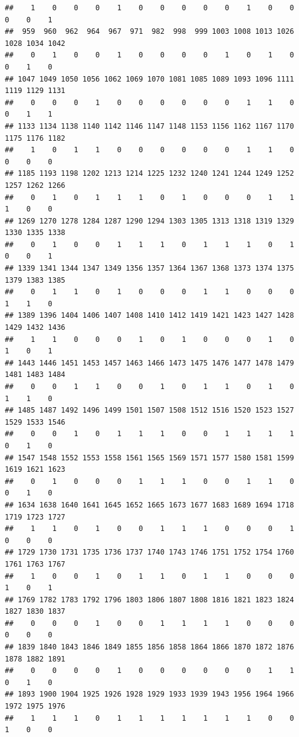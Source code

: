 \documentclass[
]{article}
\begin{document}
\begin{verbatim}
##    1    0    0    0    1    0    0    0    0    0    1    0    0    0    0    1 
##  959  960  962  964  967  971  982  998  999 1003 1008 1013 1026 1028 1034 1042 
##    0    1    0    0    1    0    0    0    0    1    0    1    0    0    1    0 
## 1047 1049 1050 1056 1062 1069 1070 1081 1085 1089 1093 1096 1111 1119 1129 1131 
##    0    0    0    1    0    0    0    0    0    0    1    1    0    0    1    1 
## 1133 1134 1138 1140 1142 1146 1147 1148 1153 1156 1162 1167 1170 1175 1176 1182 
##    1    0    1    1    0    0    0    0    0    0    1    1    0    0    0    0 
## 1185 1193 1198 1202 1213 1214 1225 1232 1240 1241 1244 1249 1252 1257 1262 1266 
##    0    1    0    1    1    1    0    1    0    0    0    1    1    1    0    0 
## 1269 1270 1278 1284 1287 1290 1294 1303 1305 1313 1318 1319 1329 1330 1335 1338 
##    0    1    0    0    1    1    1    0    1    1    1    0    1    0    0    1 
## 1339 1341 1344 1347 1349 1356 1357 1364 1367 1368 1373 1374 1375 1379 1383 1385 
##    0    1    1    0    1    0    0    0    1    1    0    0    0    1    1    0 
## 1389 1396 1404 1406 1407 1408 1410 1412 1419 1421 1423 1427 1428 1429 1432 1436 
##    1    1    0    0    0    1    0    1    0    0    0    1    0    1    0    1 
## 1443 1446 1451 1453 1457 1463 1466 1473 1475 1476 1477 1478 1479 1481 1483 1484 
##    0    0    1    1    0    0    1    0    1    1    0    1    0    1    1    0 
## 1485 1487 1492 1496 1499 1501 1507 1508 1512 1516 1520 1523 1527 1529 1533 1546 
##    0    0    1    0    1    1    1    0    0    1    1    1    1    0    1    0 
## 1547 1548 1552 1553 1558 1561 1565 1569 1571 1577 1580 1581 1599 1619 1621 1623 
##    0    1    0    0    0    1    1    1    0    0    1    1    0    0    1    0 
## 1634 1638 1640 1641 1645 1652 1665 1673 1677 1683 1689 1694 1718 1719 1723 1727 
##    1    1    0    1    0    0    1    1    1    0    0    0    1    0    0    0 
## 1729 1730 1731 1735 1736 1737 1740 1743 1746 1751 1752 1754 1760 1761 1763 1767 
##    1    0    0    1    0    1    1    0    1    1    0    0    0    1    0    1 
## 1769 1782 1783 1792 1796 1803 1806 1807 1808 1816 1821 1823 1824 1827 1830 1837 
##    0    0    0    1    0    0    1    1    1    1    0    0    0    0    0    0 
## 1839 1840 1843 1846 1849 1855 1856 1858 1864 1866 1870 1872 1876 1878 1882 1891 
##    0    0    0    0    1    0    0    0    0    0    0    1    1    0    1    0 
## 1893 1900 1904 1925 1926 1928 1929 1933 1939 1943 1956 1964 1966 1972 1975 1976 
##    1    1    1    0    1    1    1    1    1    1    1    0    0    1    0    0 

\end{verbatim}
\end{document}
